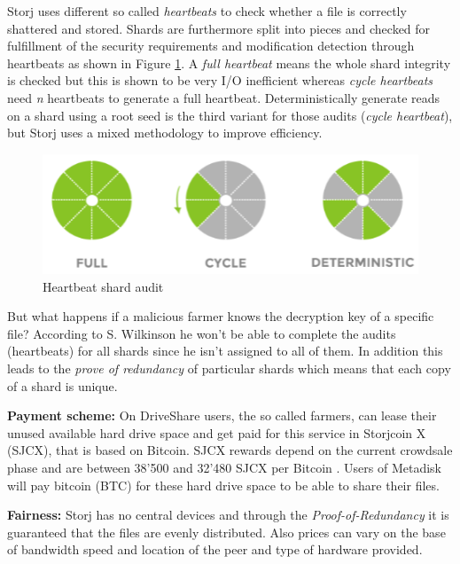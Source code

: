 Storj uses different so called \textit{heartbeats} to check whether a file is correctly shattered and stored. Shards are furthermore split into pieces and checked for fulfillment of the security requirements and modification detection through heartbeats as shown in Figure \ref{storj_heartbeat}. A \textit{full heartbeat} means the whole shard integrity is checked but this is shown to be very I/O inefficient whereas \textit{cycle heartbeats} need \textsl{n} heartbeats to generate a full heartbeat. Deterministically generate reads on a shard using a root seed is the third variant for those audits (\textit{cycle heartbeat}), but Storj uses a mixed methodology to improve efficiency.

	\begin{figure}[ht]
		\begin{center}
		\includegraphics[scale=0.8]{Talk5/storj_heartbeat.PNG}
		\end{center}
		\caption{Heartbeat shard audit \cite{storj:PDF}}
		\label{storj_heartbeat}
	\end{figure}

But what happens if a malicious farmer knows the decryption key of a specific file? According to S. Wilkinson he won't be able to complete the audits (heartbeats) for all shards since he isn't assigned to all of them. In addition this leads to the \textit{prove of redundancy} of particular shards which means that each copy of a shard is unique.

\textbf{Payment scheme:} On DriveShare users, the so called farmers, can lease their unused available hard drive space and get paid for this service in Storjcoin X (SJCX), that is based on Bitcoin. SJCX rewards depend on the current crowdsale phase and are between 38'500 and 32'480 SJCX per Bitcoin \cite{storj:crowdsale}. Users of Metadisk will pay bitcoin (BTC) for these hard drive space to be able to share their files.

\textbf{Fairness:} Storj has no central devices and through the \textit{Proof-of-Redundancy} it is guaranteed that the files are evenly distributed. Also prices can vary on the base of bandwidth speed and location of the peer and type of hardware provided.

